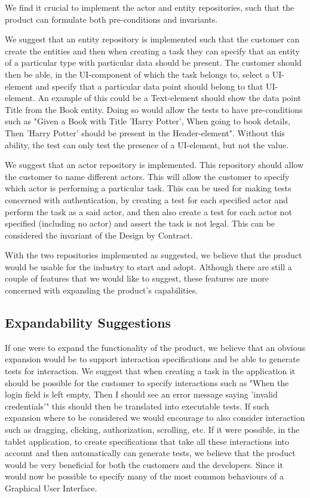 We find it crucial to implement the actor and entity repositories, such that the product can formulate both pre-conditions and invariants.

We suggest that an entity repository is implemented such that the customer can create the entities and then when creating a task they can specify that an entity of a particular type with particular data should be present.
The customer should then be able, in the UI-component of which the task belongs to, select a UI-element and specify that a particular data point should belong to that UI-element.
An example of this could be a Text-element should show the data point Title from the Book entity.
Doing so would allow the tests to have pre-conditions such as "Given a Book with Title 'Harry Potter', When going to book details, Then 'Harry Potter' should be present in the Header-element".
Without this ability, the test can only test the presence of a UI-element, but not the value.

We suggest that an actor repository is implemented.
This repository should allow the customer to name different actors.
This will allow the customer to specify which actor is performing a particular task.
This can be used for making tests concerned with authentication, by creating a test for each specified actor and perform the task as a said actor, and then also create a test for each actor not specified (including no actor) and assert the task is not legal.
This can be considered the invariant of the Design by Contract.

With the two repositories implemented as suggested, we believe that the product would be usable for the industry to start and adopt.
Although there are still a couple of features that we would like to suggest, these features are more concerned with expanding the product's capabilities.

\subsection{Expandability Suggestions}
If one were to expand the functionality of the product, we believe that an obvious expansion would be to support interaction specifications and be able to generate tests for interaction.
We suggest that when creating a task in the application it should be possible for the customer to specify interactions such as "When the login field is left empty, Then I should see an error message saying 'invalid credentials'" this should then be translated into executable tests. 
If such expansion where to be considered we would encourage to also consider interaction such as dragging, clicking, authorization, scrolling, etc.
If it were possible, in the tablet application, to create specifications that take all these interactions into account and then automatically can generate tests, we believe that the product would be very beneficial for both the customers and the developers.
Since it would now be possible to specify many of the most common behaviours of a Graphical User Interface.

